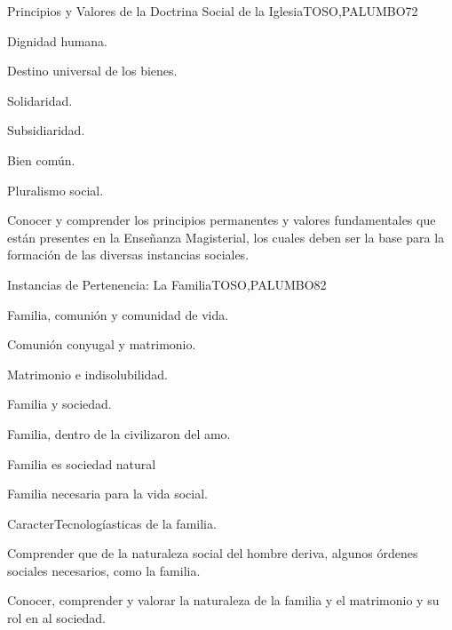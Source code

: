 \begin{syllabus}
\begin{unit}{Principios y Valores de la Doctrina Social de  la Iglesia}{TOSO,PALUMBO}{7}{2}
\begin{topics}
	\item Dignidad humana.
	\item Destino universal de los bienes.
	\item Solidaridad.
	\item Subsidiaridad.
	\item Bien común.
	\item Pluralismo social. 
\end{topics}
\begin{unitgoals}
	\item Conocer y comprender los principios permanentes y valores fundamentales que están presentes en la Enseñanza Magisterial, los cuales deben ser la base para la formación de las diversas instancias sociales.
\end{unitgoals}
\end{unit}

\begin{unit}{Instancias de Pertenencia: La Familia}{TOSO,PALUMBO}{8}{2}
\begin{topics}
	\item Familia, comunión y comunidad de vida.
	\item Comunión conyugal y matrimonio. 
	\item Matrimonio e indisolubilidad.
	\item Familia y sociedad.
	\item Familia, dentro de la civilizaron del amo.
	\item Familia es sociedad natural
	\item Familia necesaria para la vida social.
	\item CaracterTecnologíasticas de la familia.
\end{topics}
\begin{unitgoals}
	\item Comprender que de la naturaleza social del hombre deriva, algunos órdenes sociales necesarios, como la familia.
	\item Conocer, comprender y valorar la naturaleza de la familia y el matrimonio y su rol en al sociedad.
\end{unitgoals}
\end{unit}


\end{syllabus}
